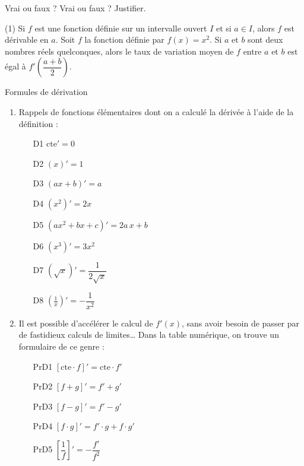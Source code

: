 \documentclass[a4paper,12pt]{article}
\begin{document}
\begin{activite}{Vrai ou faux ?}
\tcblower
Vrai ou faux ? Justifier.
\begin{tasks}(1)
  \task Si \(f\) est une fonction définie sur un intervalle ouvert \(I\) et si \(a\in I\), alors \(f\) est dérivable en \(a\).
  \task Soit \(f\) la fonction définie par \(f(x)=x^2\). Si \(a\) et \(b\) sont deux nombres réels quelconques, alors le taux de variation moyen de \(f\) entre \(a\) et \(b\) est égal à \(f'\left(\dfrac{a+b}{2}\right)\).
\end{tasks}
\end{activite}

\begin{activite}{Formules de dérivation}
\tcblower
\begin{enumerate}
  \item Rappels de fonctions élémentaires dont on a calculé la dérivée à l’aide de la définition :
	  \begin{multicols}{3}	  	
    \begin{itemize}
      \item [D1] \(\mathrm{cte}'=0\)
      \item [D2] \((x)'=1\)
      \item [D3] \((ax+b)'=a\)
      \item [D4] \((x^2)'=2x\)
      \item [D5] \((ax^2+bx+c)'=2a\,x+b\)
      \item [D6] \((x^3)'=3x^2\)
      \item [D7] \(\left(\sqrt{x}\right)'=\dfrac{1}{2\sqrt{x}}\)
      \item [D8] \(\left(\tfrac{1}{x}\right)'=-\dfrac{1}{x^2}\)
    \end{itemize}
\end{multicols}
  \item Il est possible d’accélérer le calcul de \(f'(x)\), sans avoir besoin de passer par de fastidieux calculs de limites… Dans la table numérique, on trouve un formulaire de ce genre :
	  \begin{multicols}{2}	  	
    \begin{itemize}
      \item [PrD1] \([\mathrm{cte}\cdot f]'=\mathrm{cte}\cdot f'\)
      \item [PrD2] \([f+g]'=f'+g'\)
      \item [PrD3] \([f-g]'=f'-g'\)
      \item [PrD4] \([f\cdot g]'=f'\cdot g+f\cdot g'\)
      \item [PrD5] \(\left[\dfrac{1}{f}\right]'=-\dfrac{f'}{f^2}\)

\end{itemize}
\end{multicols}
\end{enumerate}
\end{activite}
\end{document}
